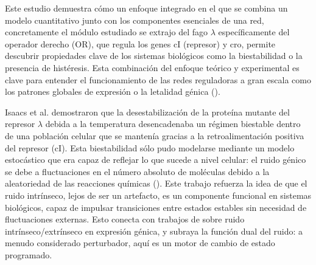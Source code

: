 \documentclass[nochap]{config/ejercicios}
\begin{document}
Este estudio demuestra cómo un enfoque integrado en el que se combina un modelo cuantitativo junto con los componentes esenciales de una red, concretamente el módulo estudiado se extrajo del fago $\lambda$ específicamente del operador derecho (OR), que regula los genes cI (represor) y cro, permite descubrir propiedades clave de los sistemas biológicos como la biestabilidad o la presencia de histéresis. Esta combinación del enfoque teórico y experimental es clave para entender el funcionamiento de las redes reguladoras a gran escala como los patrones globales de expresión o la letalidad génica (\cite{Hartwell1999}).

Isaacs et al. demostraron que la desestabilización de la proteína mutante del represor $\lambda$ debida a la temperatura desencadenaba un régimen biestable dentro de una población celular que se mantenía gracias a la retroalimentación positiva del represor (cI). Esta biestabilidad sólo pudo modelarse mediante un modelo estocástico que era capaz de reflejar lo que sucede a nivel celular: el ruido génico se debe a fluctuaciones en el número absoluto de moléculas debido a la aleatoriedad de las reacciones químicas (\cite{Ozbudak2002}). Este trabajo refuerza la idea de que el ruido intrínseco, lejos de ser un artefacto, es un componente funcional en sistemas biológicos, capaz de impulsar transiciones entre estados estables sin necesidad de fluctuaciones externas. Esto conecta con trabajos de \cite{Elowitz2000} sobre ruido intrínseco/extrínseco en expresión génica, y subraya la función dual del ruido: a menudo considerado perturbador, aquí es un motor de cambio de estado programado.


\end{document}
